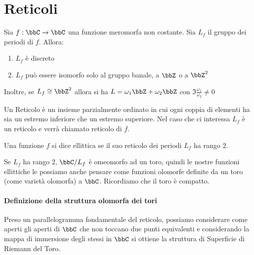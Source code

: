 \section{Reticoli}
Sia $f: \bbC \rar \bbC$ una funzione meromorfa non costante. Sia $L_f$ il gruppo dei periodi di $f$. Allora:
\begin{enumerate}
  \item $L_f$ è discreto
  \item $L_f$ può essere isomorfo solo al gruppo banale, a $\bbZ$ o a $\bbZ^2$
\end{enumerate}
Inoltre, se $L_f \cong \bbZ^2$ allora si ha $L = \omega_1 \bbZ + \omega_2 \bbZ$ con $\Im \frac{\omega_1}{\omega_2} \neq 0$

\begin{definizione}[Reticolo]
  Un Reticolo è un insieme parzialmente ordinato in cui ogni coppia di elementi ha sia un estremo inferiore che un estremo superiore.
  Nel caso che ci interessa $L_f$ è un reticolo e verrà chiamato reticolo di $f$.
\end{definizione}

\begin{definizione}
  Una funzione $f$ si dice ellittica se il suo reticolo dei periodi $L_f$ ha rango $2$.
\end{definizione}

\begin{osservazione}
  Se $L_f$ ha rango 2, $\bbC / L_f$ è omeomorfo ad un toro, quindi le nostre funzioni ellittiche le possiamo anche pensare come funzioni
  olomorfe definite da un toro (come varietà olomorfa) a $\bbC$. Ricordiamo che il toro è compatto.
\end{osservazione}

\paragraph{Definizione della struttura olomorfa dei tori}
Preso un parallelogramma fondamentale del reticolo, possiamo considerare come aperti gli aperti di $\bbC$ che non toccano due punti
equivalenti e considerando la mappa di immersione degli stessi in $\bbC$ si ottiene la struttura di Superficie di Riemann del Toro.


